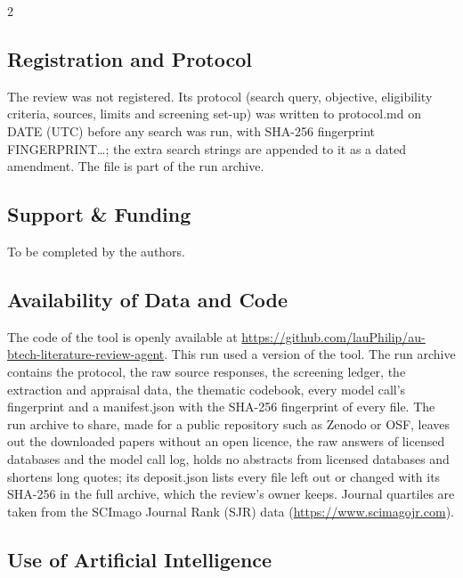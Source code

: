 \documentclass[10pt,a4paper]{article}
\begin{document}
\begin{multicols*}{2}
\subsection{Registration and Protocol}\label{sec:registration-and-protocol}

The review was not registered.
Its protocol (search query, objective, eligibility criteria, sources, limits and screening set-up) was written to protocol.md on DATE (UTC) before any search was run, with SHA-256 fingerprint FINGERPRINT\ldots{}; the extra search strings are appended to it as a dated amendment.
The file is part of the run archive.

\subsection{Support \& Funding}\label{sec:support-funding}

To be completed by the authors.

\subsection{Availability of Data and Code}\label{sec:availability-of-data-and-code}

The code of the tool is openly available at \url{https://github.com/lauPhilip/au-btech-literature-review-agent}.
This run used a version of the tool.
The run archive contains the protocol, the raw source responses, the screening ledger, the extraction and appraisal data, the thematic codebook, every model call's fingerprint and a manifest.json with the SHA-256 fingerprint of every file.
The run archive to share, made for a public repository such as Zenodo or OSF, leaves out the downloaded papers without an open licence, the raw answers of licensed databases and the model call log, holds no abstracts from licensed databases and shortens long quotes; its deposit.json lists every file left out or changed with its SHA-256 in the full archive, which the review's owner keeps.
Journal quartiles are taken from the SCImago Journal Rank (SJR) data (\url{https://www.scimagojr.com}).

\subsection{Use of Artificial Intelligence}\label{sec:use-of-artificial-intelligence}


\end{multicols*}
\end{document}
